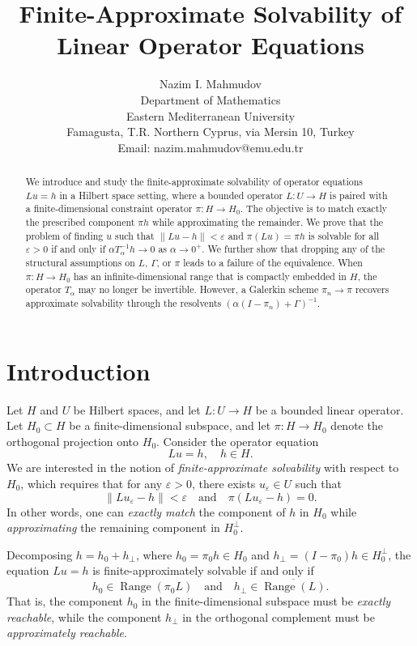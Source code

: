 \documentclass[12pt]{article}
\title{Finite-Approximate Solvability of Linear Operator Equations}
\author{Nazim I. Mahmudov \\
	Department of Mathematics \\
	Eastern Mediterranean University \\
	Famagusta, T.R. Northern Cyprus, via Mersin 10, Turkey \\
	Email: nazim.mahmudov@emu.edu.tr
}
\date{}
\DeclareMathOperator{\Range}{Range}
\begin{document}
	\maketitle
	
	\begin{abstract}
		We introduce and study the finite-approximate solvability of operator equations \(Lu = h\) in a Hilbert space setting, where a bounded operator \(L \colon U \to H\) is paired with a finite-dimensional constraint operator \(\pi \colon H \to H_0\). The objective is to match exactly the prescribed component \(\pi h\) while approximating the remainder. We prove that the problem of finding \(u\) such that \(\|Lu - h\| < \varepsilon\) and \(\pi(Lu) = \pi h\) is solvable for all \(\varepsilon > 0\) if and only if \(\alpha T_\alpha^{-1}h \to 0\) as \(\alpha \to 0^+\). We further show that dropping any of the structural assumptions on \(L\), \(\Gamma\), or \(\pi\) leads to a failure of the equivalence. When \(\pi \colon H \to H_0\) has an infinite-dimensional range that is compactly embedded in \(H\), the operator \(T_\alpha\) may no longer be invertible. However, a Galerkin scheme \(\pi_n \to \pi\) recovers approximate solvability through the resolvents \((\alpha(I - \pi_n) + \Gamma)^{-1}\).
	\end{abstract}
	
	\section{Introduction}
	
	Let \(H\) and \(U\) be Hilbert spaces, and let \(L \colon U \to H\) be a bounded linear operator. Let \(H_0 \subset H\) be a finite-dimensional subspace, and let \(\pi \colon H \to H_0\) denote the orthogonal projection onto \(H_0\). Consider the operator equation
	\[
	Lu = h, \quad h \in H.
	\]
	We are interested in the notion of \emph{finite-approximate solvability} with respect to \(H_0\), which requires that for any \(\varepsilon > 0\), there exists \(u_\varepsilon \in U\) such that
	\[
	\|Lu_\varepsilon - h\| < \varepsilon \quad \text{and} \quad \pi(Lu_\varepsilon - h) = 0.
	\]
	In other words, one can \emph{exactly match} the component of \(h\) in \(H_0\) while \emph{approximating} the remaining component in \(H_0^\perp\).
	
	Decomposing \(h = h_0 + h_\perp\), where \(h_0 = \pi_0 h \in H_0\) and \(h_\perp = (I - \pi_0)h \in H_0^\perp\), the equation \(Lu = h\) is finite-approximately solvable if and only if
	\[
	h_0 \in \Range(\pi_0 L) \quad \text{and} \quad h_\perp \in \overline{\Range(L)}.
	\]
	That is, the component \(h_0\) in the finite-dimensional subspace must be \emph{exactly reachable}, while the component \(h_\perp\) in the orthogonal complement must be \emph{approximately reachable}.
	
\end{document}
